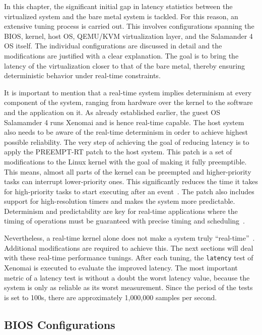 \documentclass[MMR,Master,english]{twbook}
\begin{document}
In this chapter, the significant initial gap in latency statistics between the virtualized system and the bare metal system is tackled. For this reason, an extensive tuning process is carried out. This involves configurations spanning the BIOS, kernel, host OS, QEMU/KVM virtualization layer, and the Salamander 4 OS itself. The individual configurations are discussed in detail and the modifications are justified with a clear explanation. The goal is to bring the latency of the virtualization closer to that of the bare metal, thereby ensuring deterministic behavior under real-time constraints.

\bigskip \noindent It is important to mention that a real-time system implies determinism at every component of the system, ranging from hardware over the kernel to the software and the application on it. As already established earlier, the guest OS Salamamder 4 runs Xenomai and is hence real-time capable. The host system also needs to be aware of the real-time determinism in order to achieve highest possible reliability. The very step of achieving the goal of reducing latency is to apply the PREEMPT-RT patch to the host system. This patch is a set of modifications to the Linux kernel with the goal of making it fully preemptible. This means, almost all parts of the kernel can be preempted and higher-priority tasks can interrupt lower-priority ones. This significantly reduces the time it takes for high-priority tasks to start executing after an event~\cite{RealtimeKernelPatchset}. The patch also includes support for high-resolution timers and makes the system more predictable. Determinism and predictability are key for real-time applications where the timing of operations must be guaranteed with precise timing and scheduling~\cite{rostedtInternalsRTPatch}.

\bigskip \noindent Nevertheless, a real-time kernel alone does not make a system truly “real-time”~\cite{WhatRealtimeLinux}. Additional modifications are required to achieve this. The next sections will deal with these real-time performance tunings. After each tuning, the \texttt{latency} test of Xenomai is executed to evaluate the improved latency. The most important metric of a latency test is without a doubt the worst latency value, because the system is only as reliable as its worst measurement. Since the period of the tests is set to 100\textmu s, there are approximately 1,000,000 samples per second.

\clearpage
\subsection{BIOS Configurations}\label{subsec:bios_configurations}
\end{document}
